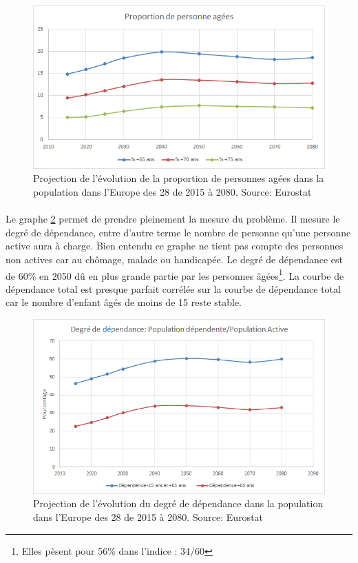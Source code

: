 \begin{figure}[h!]
    \begin{center}
        \includegraphics[scale=0.7]{document/proj_prop.png}
        \caption{Projection de l'évolution de la proportion de personnes agées dans la population dans l'Europe des 28 de 2015 à 2080. Source: Eurostat\citep{eurostat_europop13}}
        \label{proj_prop}
    \end{center}
\end{figure}

\paragraph{}Le  graphe \ref{dependance} permet de prendre pleinement la mesure du problème. Il mesure le degré de dépendance, entre d’autre terme le nombre de personne qu’une personne active aura à charge. Bien entendu ce graphe ne tient pas compte des personnes non actives car au chômage, malade ou handicapée.  Le degré de dépendance est de 60\% en 2050 dû en plus grande partie par les personnes âgées\footnote{ Elles pèsent pour 56\% dans l’indice : 34/60}. La courbe de dépendance total est presque parfait corrélée sur la courbe de dépendance total car le nombre d’enfant âgés de moins de 15 reste stable. 



\begin{figure}[h!]
    \begin{center}
        \includegraphics[scale=0.6]{document/dependance.png}
        \caption{Projection de l'évolution du degré de dépendance dans la population dans l'Europe des 28 de 2015 à 2080. Source: Eurostat\citep{eurostat_europop13}}
        \label{dependance}
    \end{center}
\end{figure}

